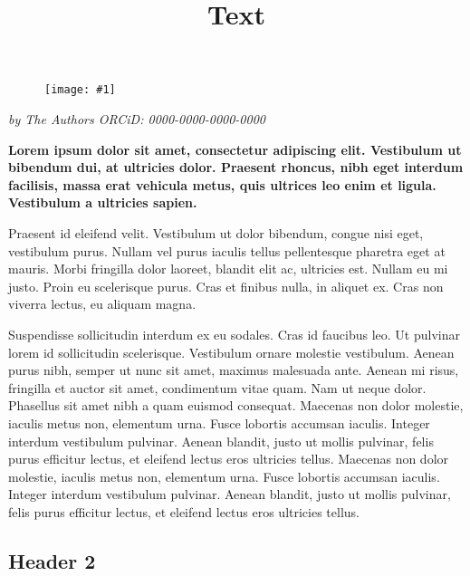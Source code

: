 \documentclass{article}
\newlength{\imgwidth}
\newcommand\scaledgraphics[2]{%
                
\settowidth{\imgwidth}{\texttt{[image: \#1]}}%
                
\setlength{\imgwidth}{\minof{\imgwidth}{#2\textwidth}}%
                
\texttt{[image: \#1]}%
                
}
\begin{document}
\title{Text}

\maketitle

\begin{figure}
\scaledgraphics{45ff9ba7-23db-4aef-8e66-5b46cab0740e.png}{1}
\label{F46825101}
\end{figure}


\emph{by The Authors ORCiD: 0000-0000-0000-0000}


\textbf{Lorem ipsum dolor sit amet, consectetur adipiscing elit. Vestibulum ut bibendum dui, at ultricies dolor. Praesent rhoncus, nibh eget interdum facilisis, massa erat vehicula metus, quis ultrices leo enim et ligula. Vestibulum a ultricies sapien.} 


Praesent id eleifend velit. Vestibulum ut dolor bibendum, congue nisi eget, vestibulum purus. Nullam vel purus iaculis tellus pellentesque pharetra eget at mauris. \autocite{gesis-ssoar-68697} Morbi fringilla dolor laoreet, blandit elit ac, ultricies est. Nullam eu mi justo. Proin eu scelerisque purus. Cras et finibus nulla, in aliquet ex. Cras non viverra lectus, eu aliquam magna. \autocite{gesis-ssoar-62624}


Suspendisse sollicitudin interdum ex eu sodales. \autocite{gesis-ssoar-70027} Cras id faucibus leo. Ut pulvinar lorem id sollicitudin scelerisque. Vestibulum ornare molestie vestibulum. Aenean purus nibh, semper ut nunc sit amet, maximus malesuada ante. Aenean mi risus, fringilla et auctor sit amet, condimentum vitae quam. Nam ut neque dolor. \autocite{https://doi.org/10.5281/zenodo.7809805} Phasellus sit amet nibh a quam euismod consequat. Maecenas non dolor molestie, iaculis metus non, elementum urna. Fusce lobortis accumsan iaculis. Integer interdum vestibulum pulvinar. Aenean blandit, justo ut mollis pulvinar, felis purus efficitur lectus, et eleifend lectus eros ultricies tellus. Maecenas non dolor molestie, iaculis metus non, elementum urna. Fusce lobortis accumsan iaculis. Integer interdum vestibulum pulvinar. Aenean blandit, justo ut mollis pulvinar, felis purus efficitur lectus, et eleifend lectus eros ultricies tellus.


\subsection{Header 2}\label{H3719843}
\end{document}

